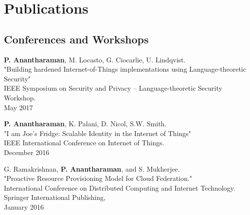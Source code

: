 \documentclass[letterpaper,10pt]{article}
\renewenvironment{itemize}{
  \begin{list}{}{
    \setlength{\leftmargin}{1.5em}
  }
}{
  \end{list}
}
\begin{document}
\section*{Publications}



\subsection*{Conferences and Workshops} %

\begin{etaremune}
  \setlength\itemsep{0ex}
  
    \item {\bf P. Anantharaman}, M. Locasto, G. Ciocarlie, U. Lindqvist.\\
        "Building hardened Internet-of-Things implementations using Language-theoretic Security"\\
        IEEE Symposium on Security and Privacy -- Language-theoretic Security Workshop.\\
        May 2017
\item {\bf P. Anantharaman}, K. Palani, D. Nicol, S.W. Smith.\\
    "I am Joe's Fridge: Scalable Identity in the Internet of Things"\\
    IEEE International Conference on Internet of Things.\\
    December 2016
\item G. Ramakrishnan, {\bf P. Anantharaman}, and S. Mukherjee.\\
    "Proactive Resource Provisioning Model for Cloud Federation."\\
    International Conference on Distributed Computing and Internet Technology. Springer International Publishing,\\
    January 2016
\end{etaremune}

\end{document}
